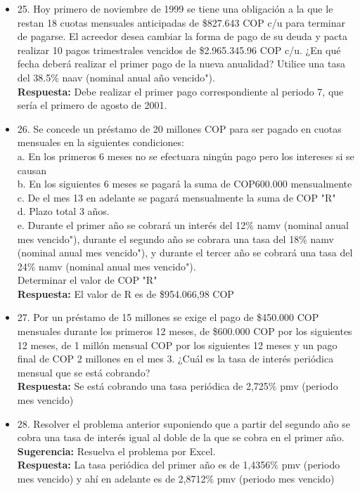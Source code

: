 \begin{itemize}
 \item 25. Hoy primero de noviembre de 1999 se tiene una obligación a la que le restan 18 cuotas mensuales anticipadas de \$827.643 COP c/u para terminar de pagarse. El acreedor desea cambiar la forma de pago de su deuda y pacta realizar 10 pagos trimestrales vencidos de \$2.965.345.96 COP c/u. ¿En qué fecha deberá realizar el primer pago de la nueva anualidad? Utilice una tasa del 38.5\% naav (nominal anual año vencido").\\
       \textbf{Respuesta:} Debe realizar el primer pago correspondiente al periodo 7, que sería el primero de agosto de 2001.\\
       \medskip

 \item 26. Se concede un préstamo de 20 millones COP para ser pagado en cuotas mensuales en la siguientes condiciones:\\
       a. En los primeros 6 meses no se efectuara ningún pago pero los intereses si se causan\\
       b. En los siguientes 6 meses se pagará la suma de COP600.000 mensualmente\\
       c. De el mes 13 en adelante se pagará mensualmente la suma de  COP  "R"\\
       d. Plazo total 3 años.\\
       e. Durante el primer año se cobrará un interés del 12\% namv (nominal anual mes vencido"), durante el segundo año se cobrara una tasa del 18\%  namv (nominal anual mes vencido"), y durante el tercer año se cobrará una tasa del 24\%  namv (nominal anual mes vencido").\\
       Determinar el valor de  COP  "R"\\
       \textbf{Respuesta:} El valor de R es de \$954.066,98 COP\\
       \medskip

 \item 27. Por un préstamo de 15 millones se exige el pago de \$450.000 COP mensuales durante los primeros 12 meses, de \$600.000 COP por los siguientes 12 meses, de 1 millón mensual COP por los siguientes 12 meses y un pago final de COP 2 millones en el mes 3. ¿Cuál es la tasa de interés periódica mensual que se está cobrando?\\
       \textbf{Respuesta:} Se está cobrando una tasa periódica de 2,725\% pmv (periodo mes vencido)\\
       \medskip

 \item 28. Resolver el problema anterior suponiendo que a partir del segundo año se cobra una tasa de interés igual al doble de la que se cobra en el primer año.\\
       \textbf{Sugerencia:} Resuelva el problema por Excel.\\
       \textbf{Respuesta:} La tasa periódica del primer año es de 1,4356\% pmv (periodo mes vencido) y ahí en adelante es de 2,8712\% pmv (periodo mes vencido)\\
       \medskip

\end{itemize}